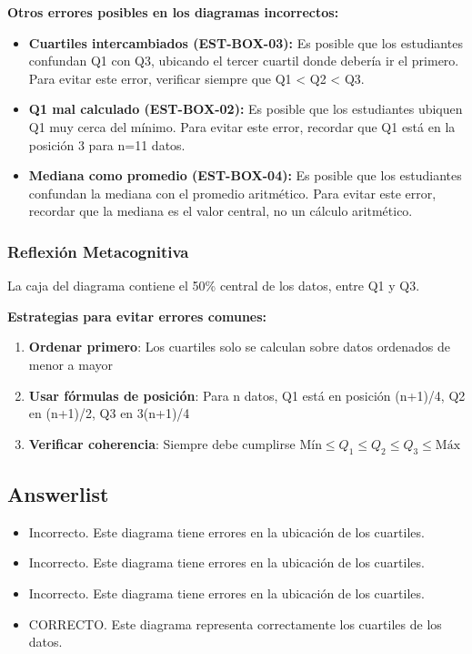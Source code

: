 \documentclass[
]{article}
\providecommand{\tightlist}{%
  \setlength{\itemsep}{0pt}\setlength{\parskip}{0pt}}
\begin{document}
\textbf{Otros errores posibles en los diagramas incorrectos:}

\begin{itemize}
\item
  \textbf{Cuartiles intercambiados (EST-BOX-03):} Es posible que los
  estudiantes confundan Q1 con Q3, ubicando el tercer cuartil donde
  debería ir el primero. Para evitar este error, verificar siempre que
  Q1 \textless{} Q2 \textless{} Q3.
\item
  \textbf{Q1 mal calculado (EST-BOX-02):} Es posible que los estudiantes
  ubiquen Q1 muy cerca del mínimo. Para evitar este error, recordar que
  Q1 está en la posición 3 para n=11 datos.
\item
  \textbf{Mediana como promedio (EST-BOX-04):} Es posible que los
  estudiantes confundan la mediana con el promedio aritmético. Para
  evitar este error, recordar que la mediana es el valor central, no un
  cálculo aritmético.
\end{itemize}

\subsubsection{Reflexión
Metacognitiva}\label{reflexiuxf3n-metacognitiva}

La caja del diagrama contiene el 50\% central de los datos, entre Q1 y
Q3.

\textbf{Estrategias para evitar errores comunes:}

\begin{enumerate}
\def\labelenumi{\arabic{enumi}.}
\tightlist
\item
  \textbf{Ordenar primero}: Los cuartiles solo se calculan sobre datos
  ordenados de menor a mayor
\item
  \textbf{Usar fórmulas de posición}: Para n datos, Q1 está en posición
  (n+1)/4, Q2 en (n+1)/2, Q3 en 3(n+1)/4
\item
  \textbf{Verificar coherencia}: Siempre debe cumplirse
  \(\text{Mín} \leq Q_1 \leq Q_2 \leq Q_3 \leq \text{Máx}\)
\end{enumerate}

\subsection{Answerlist}\label{answerlist-1}

\begin{itemize}
\tightlist
\item
  Incorrecto. Este diagrama tiene errores en la ubicación de los
  cuartiles.
\item
  Incorrecto. Este diagrama tiene errores en la ubicación de los
  cuartiles.
\item
  Incorrecto. Este diagrama tiene errores en la ubicación de los
  cuartiles.
\item
  CORRECTO. Este diagrama representa correctamente los cuartiles de los
  datos.
\end{itemize}
\end{document}
